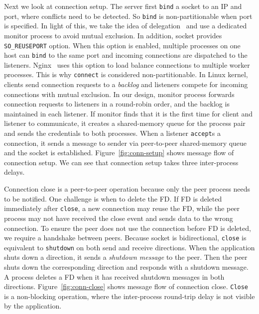 Next we look at connection setup. The server first \texttt{bind} a socket to an IP and port, where conflicts need to be detected. So \texttt{bind} is non-partitionable when port is specified. In light of this, we take the idea of delegation~\cite{roghanchi2017ffwd} and use a dedicated monitor process to avoid mutual exclusion.
In addition, socket provides \texttt{SO\_REUSEPORT} option. When this option is enabled, multiple processes on one host can \texttt{bind} to the same port and incoming connections are dispatched to the listeners. Nginx~\cite{nginx} uses this option to load balance connections to multiple worker processes. This is why \texttt{connect} is considered non-partitionable. In Linux kernel, clients send connection requests to a \textit{backlog} and listeners compete for incoming connections with mutual exclusion. In our design, monitor process forwards connection requests to listeners in a round-robin order, and the backlog is maintained in each listener. If monitor finds that it is the first time for client and listener to communicate, it creates a shared-memory queue for the process pair and sends the credentials to both processes. When a listener \texttt{accept}s a connection, it sends a message to sender via peer-to-peer shared-memory queue and the socket is established. Figure~\ref{fig:conn-setup} shows message flow of connection setup. We can see that connection setup takes three inter-process delays.

Connection close is a peer-to-peer operation because only the peer process needs to be notified. One challenge is when to delete the FD. If FD is deleted immediately after \texttt{close}, a new connection may reuse the FD, while the peer process may not have received the close event and sends data to the wrong connection. To ensure the peer does not use the connection before FD is deleted, we require a handshake between peers.
Because socket is bidirectional, \texttt{close} is equivalent to \texttt{shutdown} on both send and receive directions. When the application shuts down a direction, it sends a \textit{shutdown message} to the peer. Then the peer shuts down the corresponding direction and responds with a shutdown message. A process deletes a FD when it has received shutdown messages in both directions. Figure~\ref{fig:conn-close} shows message flow of connection close. \texttt{Close} is a non-blocking operation, where the inter-process round-trip delay is not visible by the application.


